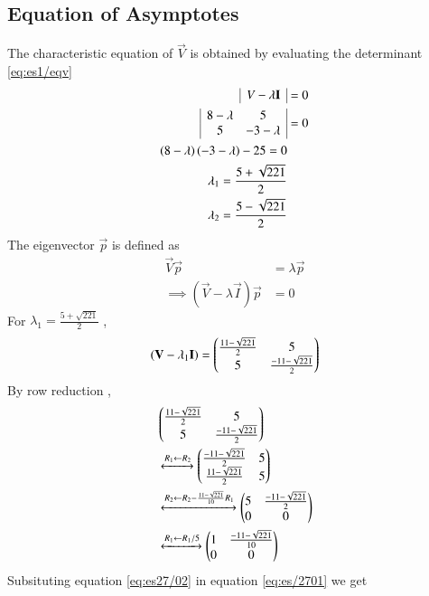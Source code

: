 \documentclass[journal,12pt,twocolumn]{IEEEtran}
\begin{document}
\subsection{Equation of Asymptotes}
The characteristic equation of $\vec{V}$ is obtained by evaluating the determinant \eqref{eq:es1/eqv}
\begin{align}
       \begin{array}{|c|}
V-\lambda\mathbf{I}
\end{array}&=0\\
   \begin{array}{|cc|}
8-\lambda & 5 \\ 5 & -3-\lambda
\end{array}&=0\\
    \left(8-\lambda\right)\left(-3-\lambda\right)-25=0\\
    \lambda_{1}= \frac{5+\sqrt{221}}{2}\\
    \lambda_{2}= \frac{5-\sqrt{221}}{2}
\end{align}
The eigenvector $\vec{p}$ is defined as 
\begin{align}
    \vec{V}\vec{p}&=\lambda\vec{p}\\
    \implies (\vec{V}-\lambda\vec{I})\vec{p}&=0\label{eq:es/2701}
\end{align}
For $\lambda_1=\frac{5+\sqrt{221}}{2}$ ,
\begin{align}
    (\mathbf{V}-\lambda_1\mathbf{I})=\begin{pmatrix}\frac{11-\sqrt{221}}{2} & 5 \\5 & \frac{-11-\sqrt{221}}{2}\end{pmatrix}
\end{align}
By row reduction , 
\begin{align}
    &\begin{pmatrix}\frac{11-\sqrt{221}}{2} & 5 \\5 & \frac{-11-\sqrt{221}}{2}\end{pmatrix}\\
    &\xleftrightarrow{R_1\leftarrow R_2}
    \begin{pmatrix}\frac{-11-\sqrt{221}}{2} & 5 \\ \frac{11-\sqrt{221}}{2} & 5\end{pmatrix}\\
 &\xleftrightarrow{R_2\leftarrow R_2-\frac{11-\sqrt{221}}{10}R_{1}}
    \begin{pmatrix}5 & \frac{-11-\sqrt{221}}{2} \\ 0& 0\end{pmatrix}\\
     &\xleftrightarrow{R_1\leftarrow R_1/5}
    \begin{pmatrix}1 & \frac{-11-\sqrt{221}}{10} \\ 0& 0\end{pmatrix}
    \label{eq:es27/02}
\end{align}
Subsituting equation \ref{eq:es27/02} in equation \ref{eq:es/2701} we get
\end{document}
